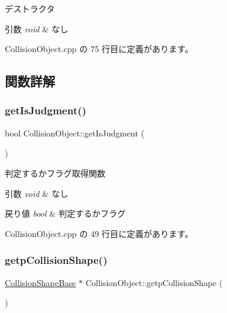 デストラクタ 


\begin{DoxyParams}{引数}
{\em void} & なし \\
\hline
\end{DoxyParams}


 Collision\+Object.\+cpp の 75 行目に定義があります。



\subsection{関数詳解}
\mbox{\label{class_collision_object_ac39d971eb18ce6555064a69a5d541940}} 
\subsubsection{\texorpdfstring{get\+Is\+Judgment()}{getIsJudgment()}}
{\footnotesize\ttfamily bool Collision\+Object\+::get\+Is\+Judgment (\begin{DoxyParamCaption}{ }\end{DoxyParamCaption})}



判定するかフラグ取得関数 


\begin{DoxyParams}{引数}
{\em void} & なし \\
\hline
\end{DoxyParams}

\begin{DoxyRetVals}{戻り値}
{\em bool} & 判定するかフラグ \\
\hline
\end{DoxyRetVals}


 Collision\+Object.\+cpp の 49 行目に定義があります。

\mbox{\label{class_collision_object_a63f9efe4e585d6e83c3e724d2a07ea2c}} 
\subsubsection{\texorpdfstring{getp\+Collision\+Shape()}{getpCollisionShape()}}
{\footnotesize\ttfamily \mbox{\hyperlink{class_collision_shape_base}{Collision\+Shape\+Base}} $\ast$ Collision\+Object\+::getp\+Collision\+Shape (\begin{DoxyParamCaption}{ }\end{DoxyParamCaption})}




